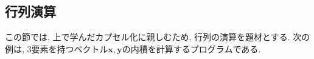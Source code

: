 \begin{comment}
以下は二次方程式の判別式を計算して, それが正, 零, 負であるときにそれぞれ異なる処理をするプログラムである.


\subsection*{$<$演習課題$>$}
二次方程式の判別式を計算し, それが正のときは二実数解,
零のときは重解, 負のときは複素数解を計算するプログラムを作成せよ.


\subsection*{$<$演習課題$>$}
自然対数の底$e$の近似値を以下に示す二つの数列を用いて計算せよ.
$n=1, 2, \cdots$と大きくしていき, 真値へと漸近する様子を確認せよ.
また, 真値との相対誤差が$10^{-10}$以下になったときにプログラムを停止するようにせよ.
\begin{equation}
a_n= \Big( 1+\frac{1}{n}\Big)^n
\end{equation}
\begin{equation}
b_n=\sum_{m=0}^{n}\frac{1}{m!}
\end{equation}

以下に, ソースコードの一部をヒントとして示す. 必要であれば参考にして良い.


\end{comment}


\subsection{行列演算}


この節では, 上で学んだカプセル化に親しむため, 行列の演算を題材とする.
次の例は, 3要素を持つベクトル$\bm{x}, \bm{y}$の内積を計算するプログラムである.

